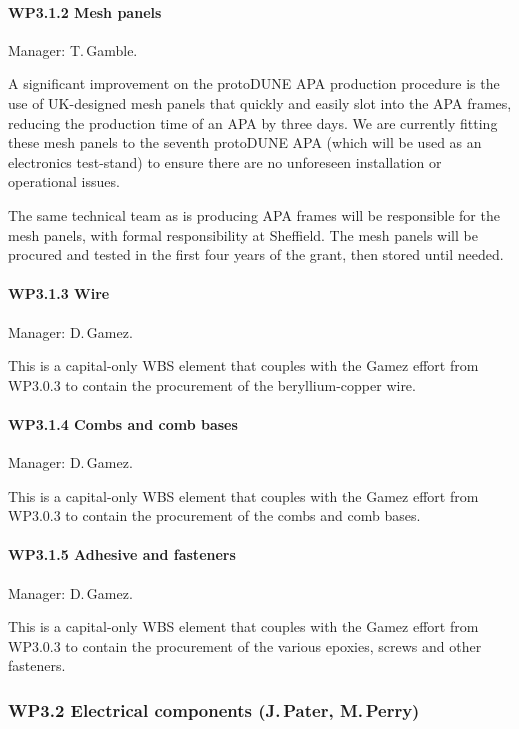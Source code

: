 \paragraph{WP3.1.2 Mesh panels} Manager: T.\,Gamble.

A significant improvement on the protoDUNE APA production procedure is the use of UK-designed mesh panels that quickly and easily slot into the APA frames, reducing the production time of an APA by three days. We are currently fitting these mesh panels to the seventh protoDUNE APA (which will be used as an electronics test-stand) to ensure there are no unforeseen installation or operational issues.

The same technical team as is producing APA frames will be responsible for the mesh panels, with formal responsibility at Sheffield. The mesh panels will be procured and tested in the first four years of the grant, then stored until needed.

\paragraph{WP3.1.3 Wire} Manager: D.\,Gamez.

This is a capital-only WBS element that couples with the Gamez effort from WP3.0.3 to contain the procurement of the beryllium-copper wire.

\paragraph{WP3.1.4 Combs and comb bases} Manager: D.\,Gamez.

This is a capital-only WBS element that couples with the Gamez effort from WP3.0.3 to contain the procurement of the combs and comb bases.

\paragraph{WP3.1.5 Adhesive and fasteners} Manager: D.\,Gamez.

This is a capital-only WBS element that couples with the Gamez effort from WP3.0.3 to contain the procurement of the various epoxies, screws and other fasteners.

\subsubsection{WP3.2 Electrical components (J.\,Pater, M.\,Perry)}


